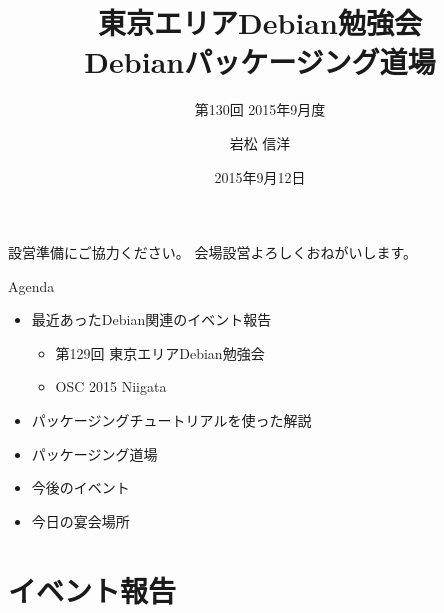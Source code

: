 \title{東京エリアDebian勉強会\\Debianパッケージング道場}
\subtitle{第130回 2015年9月度}
\author{岩松 信洋}
\date{2015年9月12日}



\begin{frame}
\titlepage{}
\end{frame}

\begin{frame}{設営準備にご協力ください。}
会場設営よろしくおねがいします。
\end{frame}

\begin{frame}{Agenda}
\begin{itemize}
   \item 最近あったDebian関連のイベント報告
	 \begin{itemize}
	 \item 第129回 東京エリアDebian勉強会
	 \item OSC 2015 Niigata
	 \end{itemize}
   \item パッケージングチュートリアルを使った解説
   \item パッケージング道場
   \item 今後のイベント
   \item 今日の宴会場所
  \end{itemize}
\end{frame}

\section{イベント報告}

